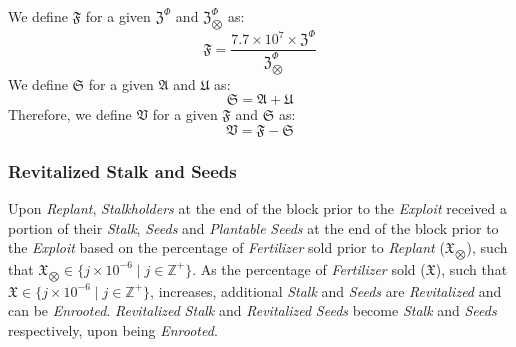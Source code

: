 \documentclass[tikz]{article}
\newcommand{\term}[1]{\textsl{#1}}
\begin{document}
We define $\mathfrak{F}$ for a given $\mathfrak{Z}^{\Phi}$ and $\mathfrak{Z}_{\bigotimes}^{\Phi}$ as:
$$\mathfrak{F} = \frac{7.7 \times 10^{7} \times \mathfrak{Z}^{\Phi}}{\mathfrak{Z}_{\bigotimes}^{\Phi}}$$
We define $\mathfrak{S}$ for a given $\mathfrak{A}$ and $\mathfrak{U}$ as: 
$$\mathfrak{S} = \mathfrak{A} + \mathfrak{U}$$
Therefore, we define $\mathfrak{V}$ for a given $\mathfrak{F}$ and $\mathfrak{S}$ as:
$$\mathfrak{V} = \mathfrak{F} - \mathfrak{S}$$

\subsubsection{Revitalized Stalk and Seeds}
Upon \term{Replant}, \term{Stalkholders} at the end of the block prior to the \term{Exploit} received a portion of their \term{Stalk}, \term{Seeds} and \term{Plantable} \term{Seeds} at the end of the block prior to the \term{Exploit} based on the percentage of \term{Fertilizer} sold prior to \term{Replant} ($\mathfrak{X}_{\bigotimes}$), such that $\mathfrak{X}_{\bigotimes} \in \{j \times 10^{-6} \mid j \in \mathbb{Z}^{+} \}$. As the percentage of \term{Fertilizer} sold ($\mathfrak{X}$), such that $\mathfrak{X} \in \{j \times 10^{-6} \mid j \in \mathbb{Z}^{+} \}$, increases, additional \term{Stalk} and \term{Seeds} are \term{Revitalized} and can be \term{Enrooted}. \term{Revitalized} \term{Stalk} and \term{Revitalized} \term{Seeds} become \term{Stalk} and \term{Seeds} respectively, upon being \term{Enrooted}. 
\end{document}

